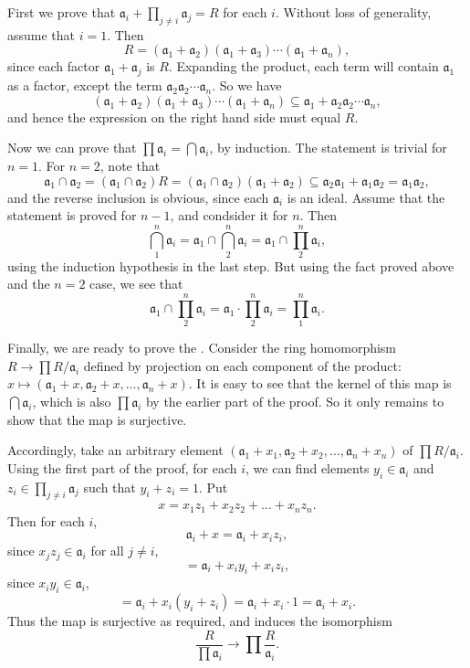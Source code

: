 \documentclass[12pt]{article}
\newcommand{\cidl}[1]{\mathfrak{{#1}}}
\begin{document}
First we prove that $\cidl{a}_i + \prod_{j \neq i} \cidl{a}_j = R$ for each $i$.  Without loss of generality, assume that $i = 1$.  Then
$$
R = (\cidl{a}_1 + \cidl{a}_2) (\cidl{a}_1 + \cidl{a}_3) \dotsm (\cidl{a}_1 + \cidl{a}_n) ,
$$
since each factor $\cidl{a}_1 + \cidl{a}_j$ is $R$.  Expanding the product, each term will contain $\cidl{a}_1$ as a factor, except the term $\cidl{a}_2 \cidl{a}_2 \dotsm \cidl{a}_n$.  So we have
$$
(\cidl{a}_1 + \cidl{a}_2) (\cidl{a}_1 + \cidl{a}_3) \dotsm (\cidl{a}_1 + \cidl{a}_n) \subseteq \cidl{a}_1 + \cidl{a}_2 \cidl{a}_2 \dotsm \cidl{a}_n ,
$$
and hence the expression on the right hand side must equal $R$.

Now we can prove that $\prod \cidl{a}_i = \bigcap \cidl{a}_i$, by induction.  The statement is trivial for $n = 1$.  For $n = 2$, note that
$$
\cidl{a}_1 \cap \cidl{a}_2 = (\cidl{a}_1 \cap \cidl{a}_2) R = (\cidl{a}_1 \cap \cidl{a}_2) (\cidl{a}_1 + \cidl{a}_2)
\subseteq \cidl{a}_2 \cidl{a}_1 + \cidl{a}_1 \cidl{a}_2 = \cidl{a}_1 \cidl{a}_2 ,
$$
and the reverse inclusion is obvious, since each $\cidl{a}_i$ is an ideal.
Assume that the statement is proved for $n-1$, and condsider it for $n$.  Then
$$
\bigcap_1^n \cidl{a}_i = \cidl{a}_1 \cap \bigcap_2^n \cidl{a}_i = \cidl{a}_1 \cap \prod_2^n \cidl{a}_i ,
$$
using the induction hypothesis in the last step.
But using the fact proved above and the $n = 2$ case, we see that
$$
\cidl{a}_1 \cap \prod_2^n \cidl{a}_i = \cidl{a}_1 \cdot \prod_2^n \cidl{a}_i = \prod_1^n \cidl{a}_i .
$$

Finally, we are ready to prove the .  Consider the ring homomorphism $R \to \prod R/\cidl{a}_i$ defined by projection on each component of the product: $x \mapsto (\cidl{a}_1 + x, \cidl{a}_2 + x, \dots , \cidl{a}_n + x)$.  It is easy to see that the kernel of this map is $\bigcap \cidl{a}_i$, which is also $\prod \cidl{a}_i$ by the earlier part of the proof.  So it only remains to show that the map is surjective.

Accordingly, take an arbitrary element $(\cidl{a}_1 + x_1, \cidl{a}_2 + x_2, \dots, \cidl{a}_n + x_n)$ of $\prod R/\cidl{a}_i$.  Using the first part of the proof, for each $i$, we can find elements $y_i \in \cidl{a}_i$ and $z_i \in \prod_{j \neq i} \cidl{a}_j$ such that $y_i + z_i = 1$.  Put
$$
x = x_1 z_1 + x_2 z_2 + \dots + x_n z_n.
$$
Then for each $i$,
$$\cidl{a}_i + x = \cidl{a}_i + x_i z_i,$$
since $x_j z_j \in \cidl{a}_i$ for all $j \neq i$,
$$=\cidl{a}_i + x_i y_i + x_i z_i,$$
since $x_i y_i \in \cidl{a}_i$,
$$=\cidl{a}_i + x_i (y_i + z_i) = \cidl{a}_i + x_i \cdot 1 = \cidl{a}_i + x_i.$$
Thus the map is surjective as required, and induces the isomorphism
$$\frac{R}{\prod \cidl{a}_i} \to \prod \frac{R}{\cidl{a}_i}.$$
\end{document}
